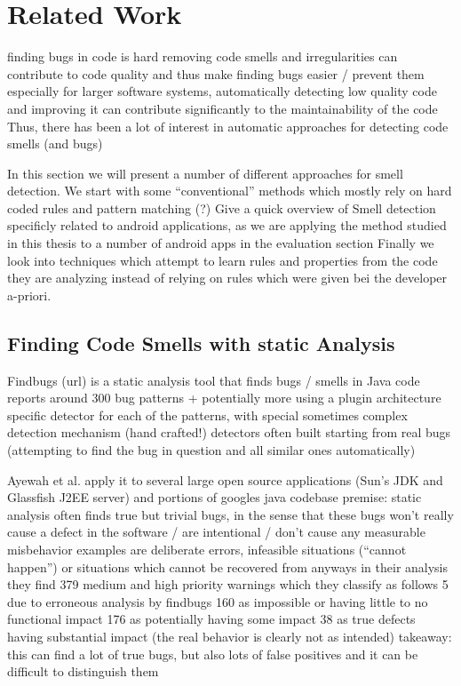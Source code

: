 \chapter{Related Work}

finding bugs in code is hard
removing code smells and irregularities can contribute to code quality and thus make finding bugs easier / prevent them
especially for larger software systems, automatically detecting low quality code and improving it can contribute significantly to the maintainability of the code
Thus, there has been a lot of interest in automatic approaches for detecting code smells (and bugs)

In this section we will present a number of different approaches for smell detection.
We start with some ``conventional'' methods which mostly rely on hard coded rules and pattern matching (?)
Give a quick overview of Smell detection specificly related to android applications, as we are applying the method studied in this thesis to a number of android apps in the evaluation section
Finally we look into techniques which attempt to learn rules and properties from the code they are analyzing instead of relying on rules which were given bei the developer a-priori.

\section{Finding Code Smells with static Analysis}

Findbugs (url) is a static analysis tool that finds bugs / smells in Java code
reports around 300 bug patterns + potentially more using a plugin architecture
specific detector for each of the patterns, with special sometimes complex detection mechanism (hand crafted!)
detectors often built starting from real bugs (attempting to find the bug in question and all similar ones automatically)

Ayewah et al. \cite{ayewah2007evaluating} apply it to several large open source applications (Sun's JDK and Glassfish J2EE server) and portions of googles java codebase
premise: static analysis often finds true but trivial bugs, in the sense that these bugs won't really cause a defect in the software / are intentional / don't cause any measurable misbehavior
examples are deliberate errors, infeasible situations (``cannot happen'') or situations which cannot be recovered from anyways
in their analysis they find 379 medium and high priority warnings which they classify as follows
5 due to erroneous analysis by findbugs
160 as impossible or having little to no functional impact
176 as potentially having some impact
38 as true defects having substantial impact (the real behavior is clearly not as intended)
takeaway: this can find a lot of true bugs, but also lots of false positives and it can be difficult to distinguish them

